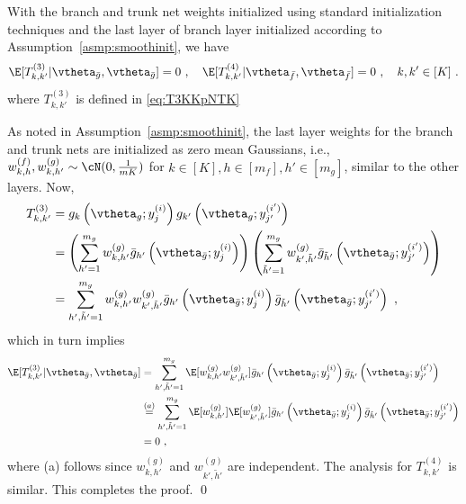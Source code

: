 \begin{prop}\label{prop:E_Tkkprime_NTK}
With the branch and trunk net weights initialized using standard initialization techniques and the last layer of branch layer initialized according to Assumption~\ref{asmp:smoothinit}, we have
    \begin{equation}
        \E[ T^{(3)}_{k,k'} | \vtheta_{\bar{g}}, \vtheta_{\bar{g}}] = 0~, \quad \E[ T^{(4)}_{k,k'} | \vtheta_{\bar{f}}, \vtheta_{\bar{f}}] = 0~,\quad k,k' \in [K]~.     
    \end{equation}
    where $T^{(3)}_{k,k'}$ is defined in \eqref{eq:T3KKpNTK}
\end{prop}
\proof
As noted in Assumption~\ref{asmp:smoothinit}, the last layer weights for the branch and trunk nets are initialized as zero mean Gaussians, i.e., $w_{k,h}^{(f)}, w_{k,h'}^{(g)} \sim \cN(0,\frac{1}{m K})$ for $k \in [K], h \in [m_f], h' \in [m_g]$, similar to the other layers. 
Now, 
\begin{align}
    \begin{aligned}
        T^{(3)}_{k,k'} & = g_k\left(\vtheta_g; y^{(i)}_j\right) g_{k'}\left(\vtheta_g; y^{(i')}_{j'} \right) \\
        & = \left(\sum_{h'=1}^{m_g} w_{k,h'}^{(g)} \bar{g}_{h'} \left(\vtheta_{\bar{g}}; y^{(i)}_j \right) \right) \left(\sum_{\tilde{h}'=1}^{m_g} w_{k',\tilde{h}'}^{(g)} \bar{g}_{\tilde{h}'} \left(\vtheta_{\bar{g}}; y^{(i')}_{j'} \right) \right) \\
        & = \sum_{h',\tilde{h}'=1}^{m_g}  w_{k,h'}^{(g)} w_{k',\tilde{h}'}^{(g)} \bar{g}_{h'} \left(\vtheta_{\bar{g}}; y^{(i)}_j \right) \bar{g}_{\tilde{h}'} \left(\vtheta_{\bar{g}}; y^{(i')}_{j'} \right)~,
    \end{aligned}
\end{align}
which in turn implies 
\begin{align}
    \begin{aligned}
        \E[ T^{(3)}_{k,k'} | \vtheta_{\bar{g}}, \vtheta_{\bar{g}}] & 
        = \sum_{h',\tilde{h}'=1}^{m_g}  \E[w_{k,h'}^{(g)} w_{k',\tilde{h}'}^{(g)}] \bar{g}_{h'} \left(\vtheta_{\bar{g}}; y^{(i)}_j \right) \bar{g}_{\tilde{h}'} \left(\vtheta_{\bar{g}}; y^{(i')}_{j'} \right) \\
        & \overset{(a)}{=} \sum_{h',\tilde{h}'=1}^{m_g}  \E[w_{k,h'}^{(g)}] \E[w_{k',\tilde{h}'}^{(g)}] \bar{g}_{h'} \left(\vtheta_{\bar{g}}; y^{(i)}_j \right) \bar{g}_{\tilde{h}'} \left(\vtheta_{\bar{g}}; y^{(i')}_{j'} \right)\\
        & = 0~,
    \end{aligned}
\end{align}
where (a) follows since $w_{k,h'}^{(g)}$ and $w_{k',\tilde{h}'}^{(g)}$ are independent. The analysis for $T^{(4)}_{k,k'}$ is similar. This completes the proof. \qed

